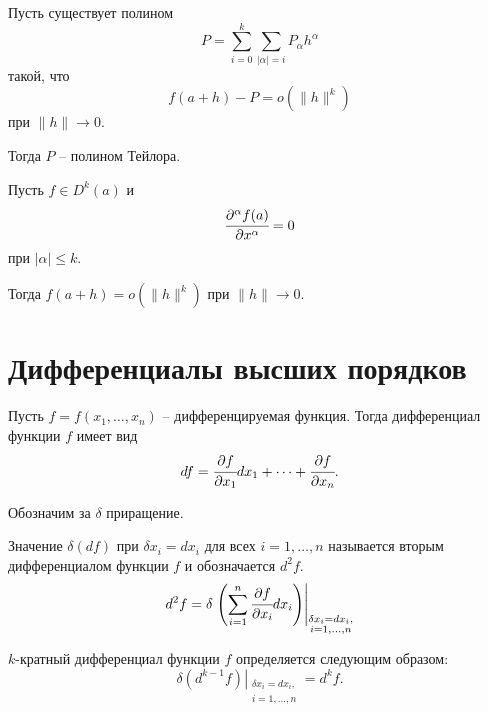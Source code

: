 	\begin{theorem}
		Пусть существует полином 
		$$
			P = \sum \limits_{i=0}^k \sum\limits_{|\alpha|=i} P_\alpha h^\alpha
		$$
		такой, что 
		$$
			f(a+h) - P = o(\|h\|^k)
		$$ при $\|h\|\to 0$.
		
		Тогда $P$ -- полином Тейлора.
	\end{theorem}
	
	\begin{corollary}
		Пусть $f\in D^k(a)$ и $$\cfrac {\partial^\alpha f(a)} {\partial x^\alpha} = 0$$ при $|\alpha| \le k$.
		
		Тогда $f(a+h) = o(\|h\|^k)$ при $\|h\|\to0$.
	\end{corollary}
	
	\section{Дифференциалы высших порядков}
	Пусть $f = f(x_1, \ldots, x_n)$ -- дифференцируемая функция.
	Тогда дифференциал функции $f$ имеет вид
	$$
		df = \cfrac {\partial f} {\partial x_1} dx_1 + \dots + \cfrac {\partial f} {\partial x_n}.	
	$$
	
	Обозначим за $\delta$ приращение.
	\begin{mdef}
		Значение $\delta(df)$ при $\delta x_i = dx_i$ для всех $i = 1,\ldots,n$ называется вторым дифференциалом функции $f$ и обозначается $d^2 f$.
		$$
			d^2 f = \delta \left. \left( \sum \limits_{i=1}^n \cfrac {\partial f}{\partial x_i}dx_i \right) \right|_{\substack{\delta x_i = dx_i, \\ i = 1,\ldots, n}}
		$$ 	
	\end{mdef}
	\begin{mdef}
		$k$-кратный дифференциал функции $f$ определяется следующим образом:
		$$
			\left.\delta(d^{k-1}f)\right|_{\substack{\delta x_i = dx_i, \\ i = 1,\ldots, n}} = d^k f.
		$$
	\end{mdef}

